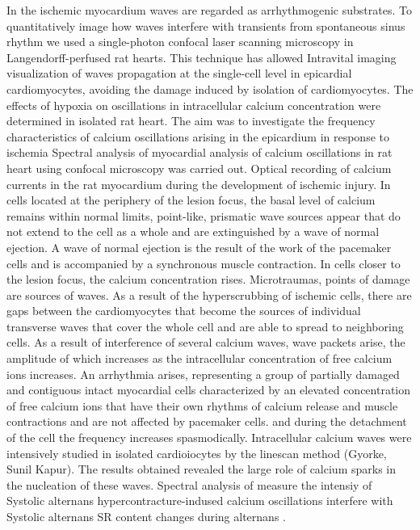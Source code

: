 \documentclass{biophys-new}
\begin{document}
In the ischemic myocardium  waves are regarded as arrhythmogenic substrates.
To quantitatively image how  waves interfere with  transients from spontaneous sinus rhythm we used a single-photon confocal laser scanning microscopy in Langendorff-perfused rat hearts.
This technique has allowed Intravital imaging visualization of  waves propagation at the single-cell level in epicardial cardiomyocytes, avoiding the damage induced by isolation of cardiomyocytes.
The effects of hypoxia on oscillations in intracellular calcium concentration  were determined in isolated rat heart.
The aim was to investigate the frequency characteristics of calcium oscillations arising in the epicardium in response to ischemia
Spectral  analysis of myocardial analysis of calcium oscillations in rat heart using confocal microscopy was carried out.
Optical recording of calcium currents in the rat myocardium during the development of ischemic injury.
In cells located at the periphery of the lesion focus, the basal level of calcium remains within normal limits, point-like, prismatic wave sources appear that do not extend to the cell as a whole and are extinguished by a wave of normal ejection.
A wave of normal ejection is the result of the work of the pacemaker cells and is accompanied by a synchronous muscle contraction.
In cells closer to the lesion focus, the calcium concentration rises.
Microtraumas, points of damage are sources of waves.
As a result of the hyperscrubbing of ischemic cells, there are gaps between the cardiomyocytes that become the sources of individual transverse waves that cover the whole cell and are able to spread to neighboring cells.
As a result of interference of several calcium waves, wave packets arise, the amplitude of which increases as the intracellular concentration of free calcium ions increases.
An arrhythmia arises, representing a group of partially damaged and contiguous intact myocardial cells characterized by an elevated concentration of free calcium ions that have their own rhythms of calcium release and muscle contractions and are not affected by pacemaker cells.
and during the detachment of the cell the frequency increases spasmodically.
Intracellular calcium waves were intensively studied in isolated cardioiocytes by the linescan method (Gyorke, Sunil Kapur).
The results obtained revealed the large role of calcium sparks in the nucleation of these waves.
Spectral analysis of measure the intensiy of Systolic  alternans
hypercontracture-indused calcium oscillations interfere with Systolic  alternans SR  content changes during alternans \cite{diaz2004sarcoplasmic}.
\end{document}
